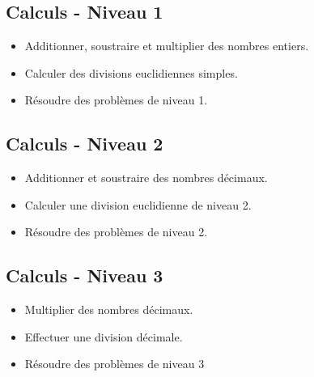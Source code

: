 \documentclass[a4paper,12pt,fleqn]{article}	
\begin{document}
\renewcommand{\labelitemi}{}

\subsection*{Calculs - Niveau 1}

\begin{itemize}
	\item {}Additionner, soustraire et multiplier des nombres entiers.
	\item {}Calculer des divisions euclidiennes simples.
	\item {}Résoudre des problèmes de niveau 1.

\end{itemize}

\subsection*{Calculs - Niveau 2}

\begin{itemize}
	\item {}Additionner et soustraire des nombres décimaux.
	\item {}Calculer une division euclidienne de niveau 2.
	\item {}Résoudre des problèmes de niveau 2.

\end{itemize}

\subsection*{Calculs - Niveau 3}

\begin{itemize}
	\item {}Multiplier des nombres décimaux.
	\item {}Effectuer une division décimale.
	\item {}Résoudre des problèmes de niveau 3
\end{itemize}


	
\end{document}
